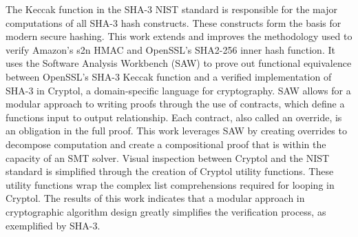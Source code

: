The Keccak function in the SHA-3 NIST standard is responsible for the major computations of all SHA-3 hash constructs.
These constructs form the basis for modern secure hashing.
This work extends and improves the methodology used to verify Amazon's s2n HMAC and OpenSSL's SHA2-256 inner hash function. 
It uses the Software Analysis Workbench (SAW) to prove out functional equivalence between OpenSSL's SHA-3 Keccak function and a verified implementation of SHA-3 in Cryptol, a domain-specific language for cryptography. 
SAW allows for a modular approach to writing proofs through the use of contracts, which define a functions input to output relationship.
Each contract, also called an override, is an obligation in the full proof.
This work leverages SAW by creating overrides to decompose computation and create a compositional proof that is within the capacity of an SMT solver. 
Visual inspection between Cryptol and the NIST standard is simplified through the creation of Cryptol utility functions.
These utility functions wrap the complex list comprehensions required for looping in Cryptol.
The results of this work indicates that a modular approach in cryptographic algorithm design greatly simplifies the verification process, as exemplified by SHA-3.
